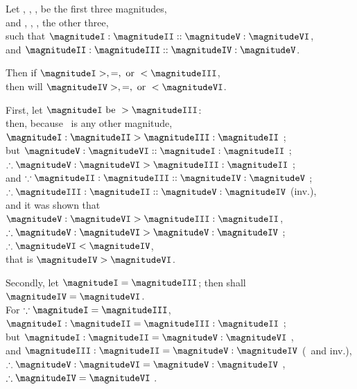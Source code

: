 \documentclass[booklanguage=english]{byrnebook}
\begin{document}
\begin{center}
Let , , , be the first three magnitudes,\\
and , , , the other three,\\
such that $\magnitudeI : \magnitudeII :: \magnitudeV : \magnitudeVI$,\\
and $\magnitudeII : \magnitudeIII :: \magnitudeIV : \magnitudeV$.

Then if $\magnitudeI >, =, \mbox{ or } < \magnitudeIII$,\\
then will $\magnitudeIV >, =, \mbox{ or } < \magnitudeVI$.

First, let $\magnitudeI \mbox{ be } > \magnitudeIII$:\\
then, because \magnitudeII\ is any other magnitude,\\
$\magnitudeI : \magnitudeII > \magnitudeIII : \magnitudeII$ ;\\
but $\magnitudeV : \magnitudeVI :: \magnitudeI : \magnitudeII$ \byref{\hypref};\\
$\therefore \magnitudeV : \magnitudeVI > \magnitudeIII : \magnitudeII$ ;\\
and $\because \magnitudeII : \magnitudeIII :: \magnitudeIV : \magnitudeV$ \byref{\hypref};\\ %
$\therefore \magnitudeIII : \magnitudeII :: \magnitudeV : \magnitudeIV$ (inv.),\\
and it was shown that $\magnitudeV : \magnitudeVI > \magnitudeIII : \magnitudeII$,
$\therefore \magnitudeV : \magnitudeVI > \magnitudeV : \magnitudeIV$ ;\\
$\therefore \magnitudeVI < \magnitudeIV$,\\
that is $\magnitudeIV > \magnitudeVI$.

Secondly, let $\magnitudeI = \magnitudeIII$; then shall $\magnitudeIV = \magnitudeVI$.\\
For $\because \magnitudeI = \magnitudeIII$,\\ %
$\magnitudeI : \magnitudeII = \magnitudeIII : \magnitudeII$ ;\\
but $\magnitudeI : \magnitudeII = \magnitudeV : \magnitudeVI$ \byref{\hypref},\\
and $\magnitudeIII : \magnitudeII = \magnitudeV : \magnitudeIV$ (\hypstr\ and inv.),\\
$\therefore \magnitudeV : \magnitudeVI = \magnitudeV : \magnitudeIV$ ,\\
$\therefore \magnitudeIV = \magnitudeVI$ .


\end{center}
\end{document}
